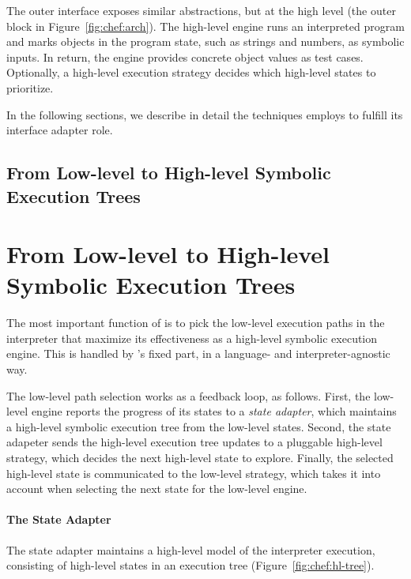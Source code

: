 The outer interface exposes similar abstractions, but at the high level (the outer block in Figure~\ref{fig:chef:arch}).
%
The high-level engine runs an interpreted program and marks objects in the program state, such as strings and numbers, as symbolic inputs.  In return, the engine provides concrete object values as test cases.
%
Optionally, a high-level execution strategy decides which high-level states to prioritize.

In the following sections, we describe in detail the techniques \chef employs to fulfill its interface adapter role.

\subsection{From Low-level to High-level Symbolic Execution Trees}


\section{From Low-level to High-level Symbolic Execution Trees}

The most important function of \chef is to pick the low-level execution paths in the interpreter that maximize its effectiveness as a high-level symbolic execution engine.
%
This is handled by \chef's fixed part, in a language- and interpreter-agnostic way.

The low-level path selection works as a feedback loop, as follows.
%
First, the low-level engine reports the progress of its states to a \emph{state adapter}, which maintains a high-level symbolic execution tree from the low-level states.
%
Second, the state adapeter sends the high-level execution tree updates to a pluggable high-level strategy, which decides the next high-level state to explore.
%
Finally, the selected high-level state is communicated to the low-level strategy, which takes it into account when selecting the next state for the low-level engine.

\paragraph{The State Adapter}

The state adapter maintains a high-level model of the interpreter execution, consisting of high-level states in an execution tree (Figure~\ref{fig:chef:hl-tree}).

